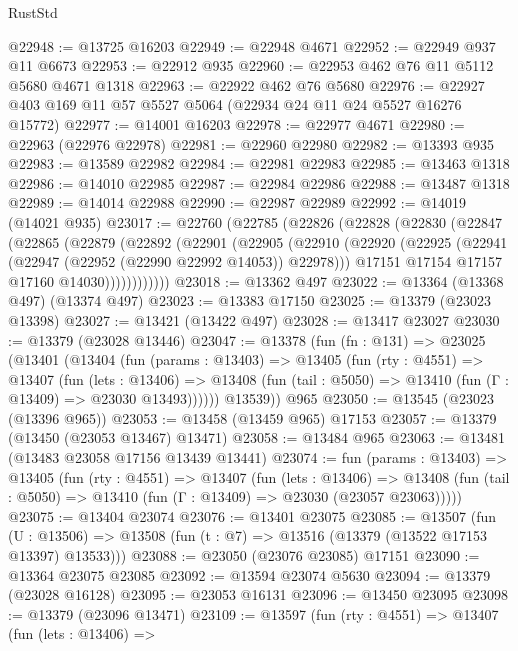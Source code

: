 \begin{lexlean}{RustStd}
\begin{coremodule}
@22948 := @13725 @16203
@22949 := @22948 @4671
@22952 := @22949 @937 @11 @6673
@22953 := @22912 @935
@22960 := @22953 @462 @76 @11 @5112 @5680 @4671 @1318
@22963 := @22922 @462 @76 @5680
@22976 := @22927 @403 @169 @11 @57 @5527 @5064 (@22934 @24 @11 @24 @5527 @16276 @15772)
@22977 := @14001 @16203
@22978 := @22977 @4671
@22980 := @22963 (@22976 @22978)
@22981 := @22960 @22980
@22982 := @13393 @935
@22983 := @13589 @22982
@22984 := @22981 @22983
@22985 := @13463 @1318
@22986 := @14010 @22985
@22987 := @22984 @22986
@22988 := @13487 @1318
@22989 := @14014 @22988
@22990 := @22987 @22989
@22992 := @14019 (@14021 @935)
@23017 := @22760
    (@22785
      (@22826
        (@22828
          (@22830
            (@22847
              (@22865
                (@22879
                  (@22892
                    (@22901
                      (@22905
                        (@22910
                          (@22920
                            (@22925 (@22941 (@22947 (@22952 (@22990 @22992 @14053)) @22978)))
                            @17151
                            @17154
                            @17157
                            @17160
                            @14030))))))))))))
@23018 := @13362 @497
@23022 := @13364 (@13368 @497) (@13374 @497)
@23023 := @13383 @17150
@23025 := @13379 (@23023 @13398)
@23027 := @13421 (@13422 @497)
@23028 := @13417 @23027
@23030 := @13379 (@23028 @13446)
@23047 := @13378
    (fun (fn : @131) =>
    @23025
      (@13401
        (@13404
          (fun (params : @13403) =>
          @13405
            (fun (rty : @4551) =>
            @13407
              (fun (lets : @13406) =>
              @13408 (fun (tail : @5050) => @13410 (fun (Γ : @13409) => @23030 @13493))))))
        @13539))
    @965
@23050 := @13545 (@23023 (@13396 @965))
@23053 := @13458 (@13459 @965) @17153
@23057 := @13379 (@13450 (@23053 @13467) @13471)
@23058 := @13484 @965
@23063 := @13481 (@13483 @23058 @17156 @13439 @13441)
@23074 := fun (params : @13403) =>
  @13405
    (fun (rty : @4551) =>
    @13407
      (fun (lets : @13406) =>
      @13408 (fun (tail : @5050) => @13410 (fun (Γ : @13409) => @23030 (@23057 @23063)))))
@23075 := @13404 @23074
@23076 := @13401 @23075
@23085 := @13507
    (fun (U : @13506) => @13508 (fun (t : @7) => @13516 (@13379 (@13522 @17153 @13397) @13533)))
@23088 := @23050 (@23076 @23085) @17151
@23090 := @13364 @23075 @23085
@23092 := @13594 @23074 @5630
@23094 := @13379 (@23028 @16128)
@23095 := @23053 @16131
@23096 := @13450 @23095
@23098 := @13379 (@23096 @13471)
@23109 := @13597
    (fun (rty : @4551) =>
    @13407
      (fun (lets : @13406) =>

\end{coremodule}
\end{lexlean}

